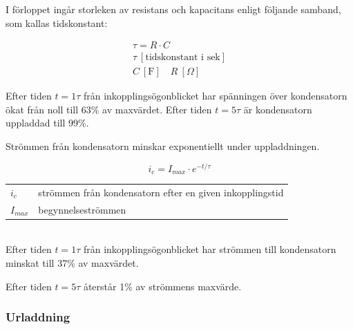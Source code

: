 I förloppet ingår storleken av resistans och kapacitans enligt följande samband,
som kallas tidskonstant:

\begin{gather*}
  \tau = R \cdot C \\
  \tau\ [\text{tidskonstant i sek}] \\
  C\ [\text{F}] \quad R\ [\Omega]
\end{gather*}

Efter tiden \(t = 1\tau\) från inkopplingsögonblicket har spänningen över
kondensatorn ökat från noll till 63\% av maxvärdet.
Efter tiden \(t = 5\tau\) är kondensatorn uppladdad till 99\%.

Strömmen från kondensatorn minskar exponentiellt under uppladdningen.

\[ i_c = I_{max} \cdot e^{-t/\tau} \]

\begin{tabular}{lp{\textwidth}}
  \(i_c\) & strömmen från kondensatorn efter en given inkopplingstid \\
  \(I_{max}\) & begynnelseströmmen \\
\end{tabular}\\[\baselineskip]

Efter tiden \(t = 1\tau\) från inkopplingsögonblicket har strömmen till
kondensatorn minskat till 37\% av maxvärdet.

Efter tiden \(t = 5\tau\) återstår 1\% av strömmens maxvärde.

\subsubsection{Urladdning}

